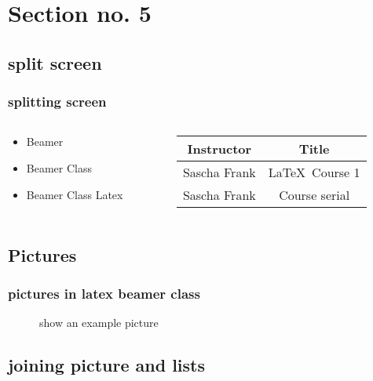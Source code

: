 \documentclass{beamer}
\begin{document}
\section{Section no. 5}
\subsection{split screen}

\begin{frame}\frametitle{splitting screen}
\begin{columns}
    \begin{column}{5cm}
        \begin{itemize}
            \item Beamer
            \item Beamer Class
            \item Beamer Class Latex
        \end{itemize}
    \end{column}
    \begin{column}{5cm}
        \begin{tabular}{|c|c|}
            \hline
            \textbf{Instructor} & \textbf{Title} \\
            \hline
            Sascha Frank &  \LaTeX \ Course 1 \\
            \hline
            Sascha Frank &  Course serial  \\
            \hline
        \end{tabular}
    \end{column}
\end{columns}
\end{frame}

\subsection{Pictures}
\begin{frame}\frametitle{pictures in latex beamer class}
\begin{figure}
\caption{show an example picture}
\end{figure}
\end{frame}

\subsection{joining picture and lists}
\end{document}
